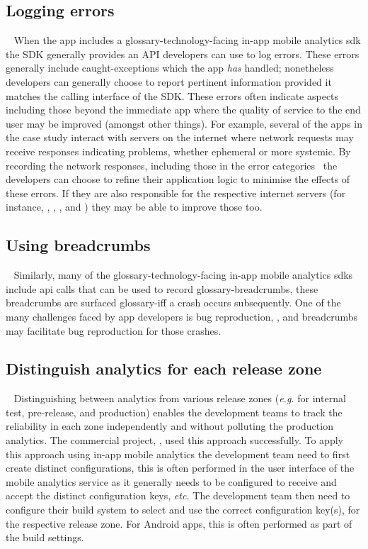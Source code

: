 \subsection{Logging errors}~\label{aata-logging-errors-topic}
When the app includes a \gls{glossary-technology-facing} in-app mobile analytics \Gls{sdk} the SDK generally provides  an API developers can use to log errors. These errors generally include caught-exceptions  which the app \emph{has} handled; nonetheless developers can generally choose to report pertinent information provided it matches the calling interface of the SDK. These errors often indicate aspects including those beyond the immediate app where the quality of service to the end user may be improved (amongst other things). For example, several of the apps in the case study interact with servers on the internet where network requests may receive responses indicating problems, whether ephemeral or more systemic. By recording the network responses, including those in the error categories~ the developers can choose to refine their application logic to minimise the effects of these errors. If they are also responsible for the respective internet servers (for instance, , , , and ) they may be able to improve those too. 

\subsection{Using breadcrumbs}~\label{aata-using-breadcrumbs-topic}
Similarly, many of the \gls{glossary-technology-facing} in-app mobile analytics \Glspl{sdk} include \Gls{api} calls that can be used to record \gls{glossary-breadcrumbs}, these breadcrumbs are surfaced \gls{glossary-iff} a crash occurs subsequently. One of the many challenges faced by app developers is bug reproduction, , and breadcrumbs may facilitate bug reproduction for those crashes.

\subsection[Analytics for each release zone]{Distinguish analytics for each release zone}~\label{aata-analytics-for-each-release-zone}
Distinguishing between analytics from various release zones (\emph{e.g.} for internal test, pre-release, and production) enables the development teams to track the reliability in each zone independently and without polluting the production analytics. The  commercial project, , used this approach successfully. To apply this approach using in-app mobile analytics the development team need to first create distinct configurations, this is often performed in the user interface of the mobile analytics service as it generally needs to be configured to receive and accept the distinct configuration keys, \emph{etc.} The development team then need to configure their build system to select and use the correct configuration key(s), for the respective release zone. For Android apps, this is often performed as part of the  build settings.

